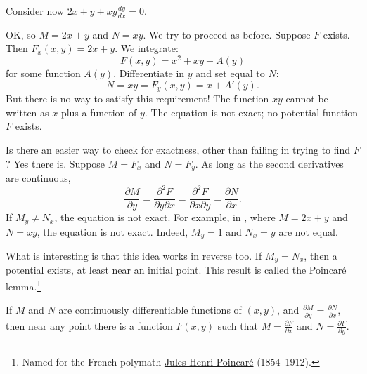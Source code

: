 \begin{example} \label{exact:example:2xyandxy}
Consider now $2x+y + xy \frac{dy}{dx} = 0$.

OK\@, so $M = 2x+y$ and $N=xy$.  We try to proceed as before.
Suppose
$F$ exists.  Then $F_x (x,y) = 2x+y$.
We integrate:
\begin{equation*}
F(x,y) = x^2 + xy + A(y)
\end{equation*}
for some function $A(y)$.  Differentiate in $y$ and set equal to $N$:
\begin{equation*}
N = xy = F_y (x,y) = x+A'(y) .
\end{equation*}
But there is no way to satisfy this requirement!  The function $xy$ cannot
be written as $x$ plus a function of $y$.  The equation is not
exact; no potential function $F$ exists.
\end{example}

Is there an easier way to check for exactness, other than failing
in trying to find $F$?
Yes there is.  Suppose
$M = F_x$ and
$N = F_y$.
As long as the second derivatives are continuous,
\begin{equation*}
\frac{\partial M}{\partial y}
=
\frac{\partial^2 F}{\partial y \partial x}
=
\frac{\partial^2 F}{\partial x \partial y}
=
\frac{\partial N}{\partial x} .
\end{equation*}
If $M_y \neq N_x$, the equation is not exact.
For example,
in ,
where $M = 2x + y$ and $N = xy$,
the equation is not exact.
Indeed,
$M_y = 1$ and $N_x = y$ are not equal.

What is interesting is that this idea works in reverse too.
If $M_y=N_x$, then a potential exists, at least near an initial point.
This result is called the Poincar\'e lemma.\footnote{Named for the French polymath
\href{https://en.wikipedia.org/wiki/Henri_Poincar\%C3\%A9}{Jules Henri
Poincar\'e} (1854--1912).}

\begin{theorem}
If $M$ and $N$ are continuously differentiable functions of $(x,y)$, and
$\frac{\partial M}{\partial y} = \frac{\partial N}{\partial x}$,
then near any point there is a function $F(x,y)$
such that
$M = \frac{\partial F}{\partial x}$ and
$N = \frac{\partial F}{\partial y}$.
\end{theorem}

